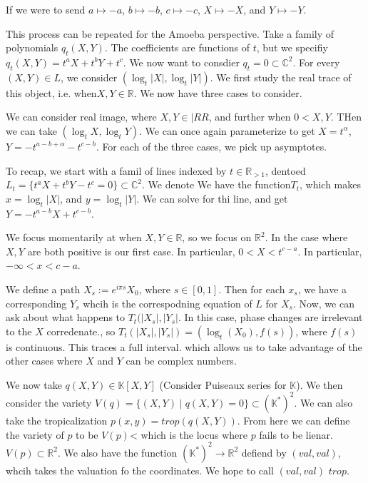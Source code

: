 \documentclass[11pt]{article}
\theoremstyle{definition}
\def\RR{{\mathbb R}}
\def\KK{{\mathbb K}}
\def\CC{{\mathbb C}}
\begin{document}
If we were to send $a \mapsto -a$, $b \mapsto -b$, $c \mapsto -c$, $X \mapsto -X$, and $Y \mapsto -Y$.


This process can be repeated for the Amoeba perspective. Take a family of polynomials $q_t(X,Y)$. The coefficients are functions of $t$, but we specifiy $q_t(X,Y) = t^aX + t^bY+t^c$. We now want to consdier $q_t = 0 \subset \CC^2$. For every $(X,Y) \in L$, we consider $(\log_t|X|,\log_t|Y|)$. We first study the real trace of this object, i.e. when$ X,Y \in \RR$. We now have three cases to consider. 


We can consider real image, where $X,Y \in |RR$, and further when $0< X,Y$. THen we can take $(\log_tX,\log_tY)$. We can once again parameterize to get $X= t^\alpha$, $Y = -t^{a-b+\alpha} -t^{c-b}$.  For each of the three cases, we pick up asymptotes.







To recap, we start with a famil of lines indexed by $t \in \RR_{>1}$, dentoed $L_t= \{t^aX + t^bY -t^c=0\} \subset \CC^2$. We denote We have the function$ T_t$, which makes $x= \log_t|X|$, and $y=\log_t|Y|$. We can solve for thi line, and get $Y= -t^{a-b}X + t^{c-b}$.


We focus momentarily at when $X,Y \in \RR$, so we focus on $\RR^2$. In the case where $X,Y$ are both positive is our first case. In particular, $0<X<t^{c-a}$. In particular, $-\infty<x<c-a$.


We define a path $X_s :=e^{i\pi s}X_0$, where $s \in [0,1]$. Then for each $x_s$, we have a corresponding $Y_s$ whcih is the correspodning equation of $L$ for $X_s$. Now, we can ask about what happens to $T_t(|X_s|, |Y_s|$. In this case, phase changes are irrelevant to the $X$ corredenate., so $T_t(|X_s|,|Y_s|)= (\log_t(X_0), f(s))$, where $f(s)$ is continuous. This traces a full interval. which allows us to take advantage of the other cases where $X$ and $Y$ can be complex numbers.





We now take $q(X,Y)\in \KK[X,Y]$ (Consider Puiseaux series for $\KK$). We then consider the variety $V(q) = \{(X,Y) \; |\; q(X,Y) = 0 \} \subset (\KK^*)^2$. We can also take the tropicalization $p(x,y) = trop(q(X,Y))$. From here we can define the variety of $p$ to be $V(p)$< which is the locus where $p$ fails to be lienar. $V(p) \subset \RR^2$. We also have the function $(\KK^*)^2 \rightarrow \RR^2$ defiend by $(val, val)$, whcih takes the valuation fo the coordinates. We hope to call $(val, val)$ $trop$. 
\end{document}

